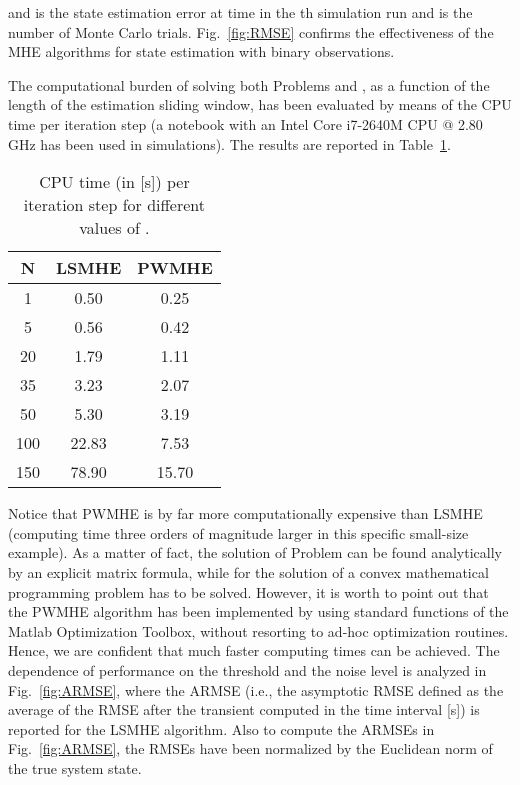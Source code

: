 \documentclass[11pt,journal,onecolumn]{IEEEtran}
\begin{document}
and  is the state estimation error at time  in the th simulation run and  is the number of Monte Carlo trials.
Fig.~\ref{fig:RMSE} confirms the effectiveness of the MHE algorithms for state estimation with binary observations.

The computational burden of solving both Problems  and , as a function of the length  of the estimation sliding window, has been evaluated by means of the CPU time per iteration step (a notebook with an Intel Core i7-2640M CPU @ 2.80 GHz has been used in simulations).
The results are reported in Table~\ref{table_1}.
\begin{table}[tb]
\centering
\begin{tabular}{|c|c|c|}
\hline
N               & LSMHE                   & PWMHE     \\
\hline
1               & 0.50     & 0.25      \\
5               & 0.56     & 0.42      \\
20              & 1.79     & 1.11      \\
35              & 3.23     & 2.07      \\
50              & 5.30     & 3.19      \\
100             & 22.83    & 7.53      \\
150             & 78.90    & 15.70      \\
\hline
\end{tabular}
\caption{CPU time (in [s]) per iteration step for different values of .}
\label{table_1}
\end{table}
Notice that PWMHE is by far more computationally expensive than LSMHE (computing time three orders of magnitude larger in this specific small-size example). As a matter of fact, the solution of Problem  can be found analytically by an explicit matrix formula, while for the solution of  a convex mathematical programming problem has to be solved. However, it is worth to point out that the PWMHE algorithm has been implemented by using standard functions of the Matlab Optimization Toolbox, without resorting to ad-hoc optimization routines. Hence, we are confident that much faster computing times can be achieved. The dependence of performance on the threshold  and the noise level  is analyzed in Fig.~\ref{fig:ARMSE}, where the ARMSE (i.e., the asymptotic RMSE defined as the average of the RMSE after the transient computed in the time interval  [s]) is reported for the LSMHE algorithm. Also to compute the ARMSEs in Fig.~\ref{fig:ARMSE}, the RMSEs have been normalized by the Euclidean norm of the true system state.
\end{document}
